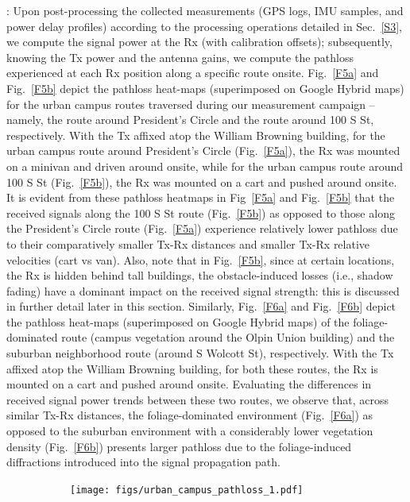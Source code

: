 \documentclass[12pt, draftcls, onecolumn]{IEEEtran}
\begin{document}
{: Upon post-processing the collected measurements (GPS logs, IMU samples, and power delay profiles) according to the processing operations detailed in Sec.~\ref{S3}, we compute the signal power at the Rx (with calibration offsets); subsequently, knowing the Tx power and the antenna gains, we compute the pathloss experienced at each Rx position along a specific route onsite. Fig.~\ref{F5a} and Fig.~\ref{F5b} depict the pathloss heat-maps (superimposed on Google Hybrid maps) for the urban campus routes traversed during our measurement campaign -- namely, the route around President's Circle and the route around 100 S St, respectively. With the Tx affixed atop the William Browning building, for the urban campus route around President's Circle (Fig.~\ref{F5a}), the Rx was mounted on a minivan and driven around onsite, while for the urban campus route around 100 S St (Fig.~\ref{F5b}), the Rx was mounted on a cart and pushed around onsite. It is evident from these pathloss heatmaps in Fig~\ref{F5a} and Fig.~\ref{F5b} that the received signals along the 100 S St route (Fig.~\ref{F5b}) as opposed to those along the President's Circle route (Fig.~\ref{F5a}) experience relatively lower pathloss due to their comparatively smaller Tx-Rx distances and smaller Tx-Rx relative velocities (cart vs van). Also, note that in Fig.~\ref{F5b}, since at certain locations, the Rx is hidden behind tall buildings, the obstacle-induced losses (i.e., shadow fading) have a dominant impact on the received signal strength: this is discussed in further detail later in this section. Similarly, Fig.~\ref{F6a} and Fig.~\ref{F6b} depict the pathloss heat-maps (superimposed on Google Hybrid maps) of the foliage-dominated route (campus vegetation around the Olpin Union building) and the suburban neighborhood route (around S Wolcott St), respectively. With the Tx affixed atop the William Browning building, for both these routes, the Rx is mounted on a cart and pushed around onsite. Evaluating the differences in received signal power trends between these two routes, we observe that, across similar Tx-Rx distances, the foliage-dominated environment (Fig.~\ref{F6a}) as opposed to the suburban environment with a considerably lower vegetation density (Fig.~\ref{F6b}) presents larger pathloss due to the foliage-induced diffractions introduced into the signal propagation path.
\begin{figure} [t]
     \centering
     \begin{subfigure}{0.563\linewidth}
         \centering
         \texttt{[image: figs/urban\_campus\_pathloss\_1.pdf]}

\end{subfigure}
\end{figure}}
\end{document}
